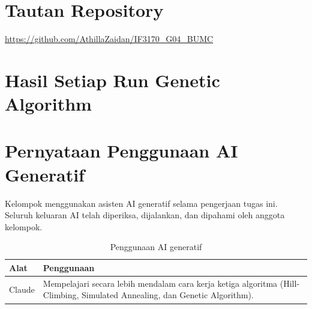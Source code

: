 \section{Tautan Repository}

\url{https://github.com/AthillaZaidan/IF3170_G04_BUMC}

\section{Hasil Setiap Run Genetic Algorithm}



\section{Pernyataan Penggunaan AI Generatif}

Kelompok menggunakan asisten AI generatif selama pengerjaan tugas ini. Seluruh keluaran
AI telah diperiksa, dijalankan, dan dipahami oleh anggota kelompok.

\begin{table}[H]
	\centering
	\caption{Penggunaan AI generatif}
	\label{tab:genai}
	\begin{tabular}{p{2.5cm} p{10.7cm}}
		\toprule
		\textbf{Alat} & \textbf{Penggunaan} \\
		\midrule
		Claude & Mempelajari secara lebih mendalam cara kerja ketiga algoritma
		(Hill-Climbing, Simulated Annealing, dan Genetic Algorithm). \\
		\bottomrule
	\end{tabular}
\end{table}
